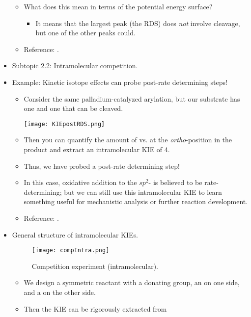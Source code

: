 \documentclass[../notes.tex]{subfiles}
\begin{document}
\begin{itemize}
\begin{itemize}
\begin{itemize}
        \end{itemize}
        \item What does this mean in terms of the potential energy surface?
        \begin{itemize}
            \item It means that the largest peak (the RDS) does \emph{not} involve  cleavage, but one of the other peaks could.
        \end{itemize}
        \item Reference: \textcite{bib:KIEexpt}.
    \end{itemize}
    \item Subtopic 2.2{}: Intramolecular competition.
    \item Example: Kinetic isotope effects can probe post-rate determining steps!
    \begin{itemize}
        \item Consider the same palladium-catalyzed arylation, but our substrate has one  and one  that can be cleaved.
        \begin{center}
            \texttt{[image: KIEpostRDS.png]}
        \end{center}
        \item Then you can quantify the amount of  vs.  at the \emph{ortho}-position in the product and extract an intramolecular KIE of 4.
        \item Thus, we have probed a post-rate determining step!
        \item In this case, oxidative addition to the $sp^2$- is believed to be rate-determining; but we can still use this intramolecular KIE to learn something useful for mechanistic analysis or further reaction development.
        \item Reference: \textcite{bib:KIEexpt}.
    \end{itemize}
    \item General structure of intramolecular KIEs.
    \begin{figure}[h!]
        \centering
        \texttt{[image: compIntra.png]}
        \caption{Competition experiment (intramolecular).}
        \label{fig:compIntra}
    \end{figure}
    \begin{itemize}
        \item We design a symmetric reactant with a donating group, an  on one side, and a  on the other side.
        \item Then the KIE can be rigorously extracted from

\end{itemize}
\end{itemize}
\end{document}
